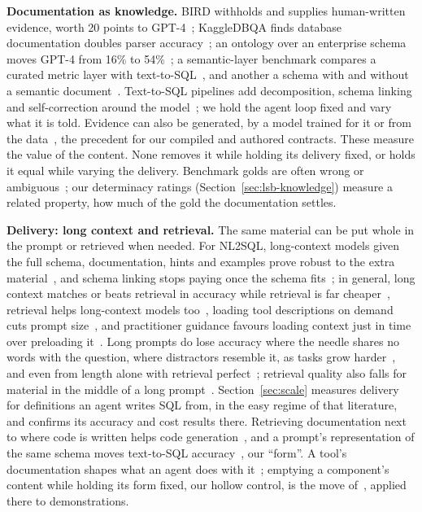 \textbf{Documentation as knowledge.} BIRD withholds and supplies
human-written evidence, worth 20 points to GPT-4~\cite{bird}; KaggleDBQA
finds database documentation doubles parser accuracy~\cite{kaggledbqa};
an ontology over an enterprise schema moves GPT-4 from 16\% to
54\%~\cite{sequeda-kg}; a semantic-layer benchmark compares a curated metric
layer with text-to-SQL~\cite{dbt-benchmark}, and another a schema with and
without a semantic document~\cite{semantic-paired}. Text-to-SQL pipelines
add decomposition, schema linking and self-correction around the
model~\cite{din-sql,mac-sql,chess,dail-sql}; we hold the agent loop fixed
and vary what it is told. Evidence can
also be generated, by a model trained for it or from the
data~\cite{knowledge-to-sql,seed}, the precedent for our compiled and
authored contracts. These measure the value of the content. None removes it
while holding its delivery fixed, or holds it equal while varying the
delivery. Benchmark golds are often wrong or
ambiguous~\cite{annotation-errors,bird-noise,ambrosia}; our determinacy
ratings (Section~\ref{sec:lsb-knowledge}) measure a related property, how
much of the gold the documentation settles.

\textbf{Delivery: long context and retrieval.} The same material can be
put whole in the prompt or retrieved when needed. For NL2SQL, long-context
models given the full schema, documentation, hints and examples prove
robust to the extra material~\cite{chung-long-context}, and schema linking stops paying
once the schema fits~\cite{death-schema-linking}; in general, long context
matches or beats retrieval in accuracy while retrieval is far
cheaper~\cite{rag-or-long-context}, retrieval helps long-context models
too~\cite{retrieval-meets-long-context}, loading
tool descriptions on demand cuts prompt size~\cite{rag-mcp}, and
practitioner guidance favours loading context just in time over preloading
it~\cite{anthropic-context}. Long prompts
do lose accuracy where the needle shares no words with the question, where
distractors resemble it, as tasks grow harder~\cite{nolima,context-rot,ruler},
and even from length alone with retrieval
perfect~\cite{length-alone-hurts};
retrieval quality also falls for material in the middle of a long
prompt~\cite{lost-in-the-middle}. Section~\ref{sec:scale} measures delivery
for definitions an agent writes SQL from, in the easy regime of that
literature, and confirms its accuracy and cost results there. Retrieving
documentation next to where code is written helps code
generation~\cite{docprompting}, and a prompt's representation of the same
schema moves text-to-SQL accuracy~\cite{dail-sql}, our ``form''. A tool's
documentation shapes what an agent does with it~\cite{tool-documentation};
emptying a component's content while holding its form fixed, our hollow
control, is the move of~\cite{min-demonstrations}, applied there to
demonstrations.

